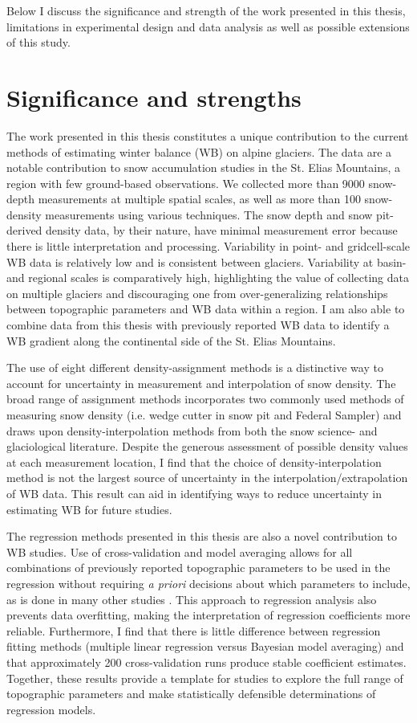 \documentclass{sfuthesis}
\begin{document}
Below I discuss the significance and strength of the work presented in this thesis, limitations in experimental design and data analysis as well as possible extensions of this study.


\section{Significance and strengths}

The work presented in this thesis constitutes a unique contribution to the current methods of estimating winter balance (WB) on alpine glaciers. The data are a notable contribution to snow accumulation studies in the St. Elias Mountains, a region with few ground-based observations. We collected more than 9000 snow-depth measurements at multiple spatial scales, as well as more than 100 snow-density measurements using various techniques. The snow depth and snow pit-derived density data, by their nature, have minimal measurement error because there is little interpretation and processing. Variability in point- and gridcell-scale WB data is relatively low and is consistent between glaciers. Variability at basin- and regional scales is comparatively high, highlighting the value of collecting data on multiple glaciers and discouraging one from over-generalizing relationships between topographic parameters and WB data within a region. I am also able to combine data from this thesis with previously reported WB data to identify a WB gradient along the continental side of the St. Elias Mountains. 

The use of eight different density-assignment methods is a distinctive way to account for uncertainty in  measurement and interpolation of snow density. The broad range of assignment methods incorporates two commonly used methods of measuring snow density (i.e. wedge cutter in snow pit and Federal Sampler) and draws upon density-interpolation methods from both the snow science- and glaciological literature. Despite the generous assessment of possible density values at each measurement location, I find that the choice of density-interpolation method is not the largest source of uncertainty in the interpolation/extrapolation of WB data. This result can aid in identifying ways to reduce uncertainty in estimating WB for future studies. 

The regression methods presented in this thesis are also a novel contribution to WB studies. Use of cross-validation and model averaging allows for all combinations of previously reported topographic parameters to be used in the regression without requiring \textit{a priori} decisions about which parameters to include, as is done in many other studies \citep[e.g.][]{Wheler2014}. This approach to regression analysis also prevents data overfitting, making the interpretation of regression coefficients more reliable. Furthermore, I find that there is little difference between regression fitting methods (multiple linear regression versus Bayesian model averaging) and that approximately 200 cross-validation runs produce stable coefficient estimates. Together, these results provide a template for studies to explore the full range of topographic parameters and make statistically defensible determinations of regression models.
\end{document}
